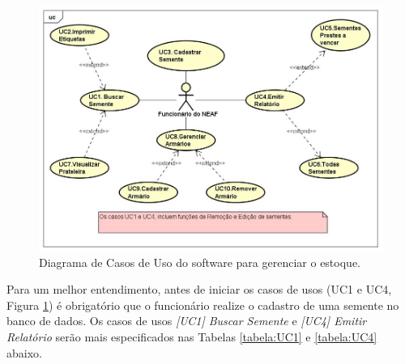 \documentclass[12pt,a4paper]{article}
\begin{document}
\begin{figure}[htpb]
\centering %
\includegraphics[width=16cm]{Figuras/UserCase.jpg} %
\caption{Diagrama de Casos de Uso do software para gerenciar o estoque.} 
\label{figura:User_Case}
\end{figure}

Para um melhor entendimento, antes de iniciar os casos de usos (UC1 e UC4, Figura \ref{figura:User_Case}) é obrigatório que o funcionário realize o cadastro de uma semente no banco de dados. Os casos de usos  {\it [UC1] Buscar Semente} e {\it [UC4] Emitir Relatório} serão mais especificados nas Tabelas \ref{tabela:UC1} e \ref{tabela:UC4} abaixo.
\end{document}
